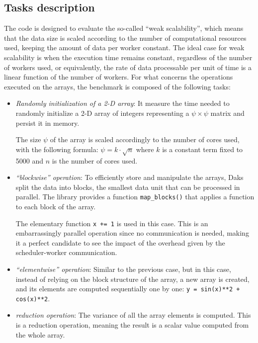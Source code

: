 \subsection{Tasks description}\label{subsec:benchmarktasks}

The code is designed to evaluate the so-called ``weak scalability'', which means
that the data size is scaled according to the number of computational resources
used, keeping the amount of data per worker constant. The ideal case for weak
scalability is when the execution time remains constant, regardless of the
number of workers used, or equivalently, the rate of data processable per unit
of time is a linear function of the number of workers. For what concerns the
operations executed on the arrays, the benchmark is composed of the following
tasks:

\begin{itemize}
  \itemsep0em
  \item \textit{Randomly initialization of a 2-D array}: It measure the time
    needed to randomly initialize a 2-D array of integers representing a
    $\psi\times\psi$ matrix and persist it in memory.

    The size $\psi$ of the array is scaled accordingly to the number of cores
    used, with the following formula: $\psi = k \cdot \sqrt{n}$ where $k$ is a
    constant term fixed to 5000 and $n$ is the number of cores used.
  \item \textit{``blockwise'' operation}: To efficiently store and manipulate
    the arrays, Daks split the data into blocks, the smallest data unit that
    can be processed in parallel. The library provides a function
    \texttt{map\_blocks()} that applies a function to each block of the array.

    The elementary function \texttt{x += 1} is used in this case.
    This is an embarrassingly parallel operation since no communication is
    needed, making it a perfect candidate to see the impact of the overhead
    given by the scheduler-worker communication.
  \item \textit{``elementwise'' operation}: Similar to the previous case, but in
    this case, instead of relying on the block structure of the array, a new
    array is created, and its elements are computed sequentially one by one:
    \texttt{y = sin(x)**2 + cos(x)**2}.
  \item \textit{reduction operation}: The variance of all the array elements is
    computed. This is a reduction operation, meaning the result is a scalar
    value computed from the whole array.


\end{itemize}
